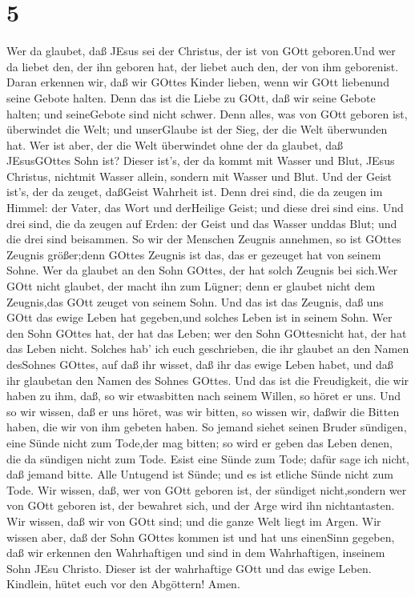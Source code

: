 \hypertarget{section-4}{%
\section{5}\label{section-4}}

 Wer da glaubet, daß JEsus sei der Christus, der ist von
GOtt geboren.Und wer da liebet den, der ihn geboren hat, der liebet auch
den, der von ihm geborenist.  Daran erkennen wir, daß wir
GOttes Kinder lieben, wenn wir GOtt liebenund seine Gebote halten.
 Denn das ist die Liebe zu GOtt, daß wir seine Gebote
halten; und seineGebote sind nicht schwer.  Denn alles, was
von GOtt geboren ist, überwindet die Welt; und unserGlaube ist der Sieg,
der die Welt überwunden hat.  Wer ist aber, der die Welt
überwindet ohne der da glaubet, daß JEsusGOttes Sohn ist? 
Dieser ist's, der da kommt mit Wasser und Blut, JEsus Christus, nichtmit
Wasser allein, sondern mit Wasser und Blut. Und der Geist ist's, der da
zeuget, daßGeist Wahrheit ist.  Denn drei sind, die da
zeugen im Himmel: der Vater, das Wort und derHeilige Geist; und diese
drei sind eins.  Und drei sind, die da zeugen auf Erden: der
Geist und das Wasser unddas Blut; und die drei sind beisammen.
 So wir der Menschen Zeugnis annehmen, so ist GOttes Zeugnis
größer;denn GOttes Zeugnis ist das, das er gezeuget hat von seinem
Sohne.  Wer da glaubet an den Sohn GOttes, der hat solch
Zeugnis bei sich.Wer GOtt nicht glaubet, der macht ihn zum Lügner; denn
er glaubet nicht dem Zeugnis,das GOtt zeuget von seinem Sohn.
 Und das ist das Zeugnis, daß uns GOtt das ewige Leben hat
gegeben,und solches Leben ist in seinem Sohn.  Wer den Sohn
GOttes hat, der hat das Leben; wer den Sohn GOttesnicht hat, der hat das
Leben nicht.  Solches hab' ich euch geschrieben, die ihr
glaubet an den Namen desSohnes GOttes, auf daß ihr wisset, daß ihr das
ewige Leben habet, und daß ihr glaubetan den Namen des Sohnes GOttes.
 Und das ist die Freudigkeit, die wir haben zu ihm, daß, so
wir etwasbitten nach seinem Willen, so höret er uns.  Und
so wir wissen, daß er uns höret, was wir bitten, so wissen wir, daßwir
die Bitten haben, die wir von ihm gebeten haben.  So jemand
siehet seinen Bruder sündigen, eine Sünde nicht zum Tode,der mag bitten;
so wird er geben das Leben denen, die da sündigen nicht zum Tode. Esist
eine Sünde zum Tode; dafür sage ich nicht, daß jemand bitte.
 Alle Untugend ist Sünde; und es ist etliche Sünde nicht
zum Tode.  Wir wissen, daß, wer von GOtt geboren ist, der
sündiget nicht,sondern wer von GOtt geboren ist, der bewahret sich, und
der Arge wird ihn nichtantasten.  Wir wissen, daß wir von
GOtt sind; und die ganze Welt liegt im Argen.  Wir wissen
aber, daß der Sohn GOttes kommen ist und hat uns einenSinn gegeben, daß
wir erkennen den Wahrhaftigen und sind in dem Wahrhaftigen, inseinem
Sohn JEsu Christo. Dieser ist der wahrhaftige GOtt und das ewige Leben.
 Kindlein, hütet euch vor den Abgöttern! Amen.
